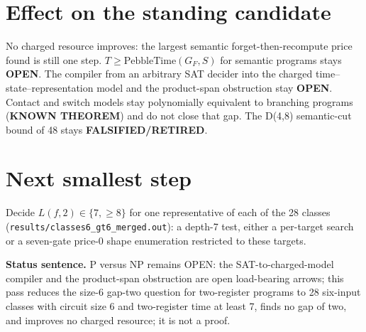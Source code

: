 \documentclass[11pt]{article}
\begin{document}
\section*{Effect on the standing candidate}
No charged resource improves: the largest semantic forget-then-recompute price found is still one step. $T\ge\mathrm{PebbleTime}(G_F,S)$ for semantic programs stays \textbf{OPEN}. The compiler from an arbitrary SAT decider into the charged time--state--representation model and the product-span obstruction stay \textbf{OPEN}. Contact and switch models stay polynomially equivalent to branching programs (\textbf{KNOWN THEOREM}) and do not close that gap. The D(4,8) semantic-cut bound of 48 stays \textbf{FALSIFIED/RETIRED}.

\section*{Next smallest step}
Decide $L(f,2)\in\{7,\ge8\}$ for one representative of each of the 28 classes (\texttt{results/classes6\_gt6\_merged.out}): a depth-7 test, either a per-target search or a seven-gate price-0 shape enumeration restricted to these targets.

\bigskip
\noindent\textbf{Status sentence.} P versus NP remains OPEN: the SAT-to-charged-model compiler and the product-span obstruction are open load-bearing arrows; this pass reduces the size-6 gap-two question for two-register programs to 28 six-input classes with circuit size 6 and two-register time at least 7, finds no gap of two, and improves no charged resource; it is not a proof.
\end{document}
